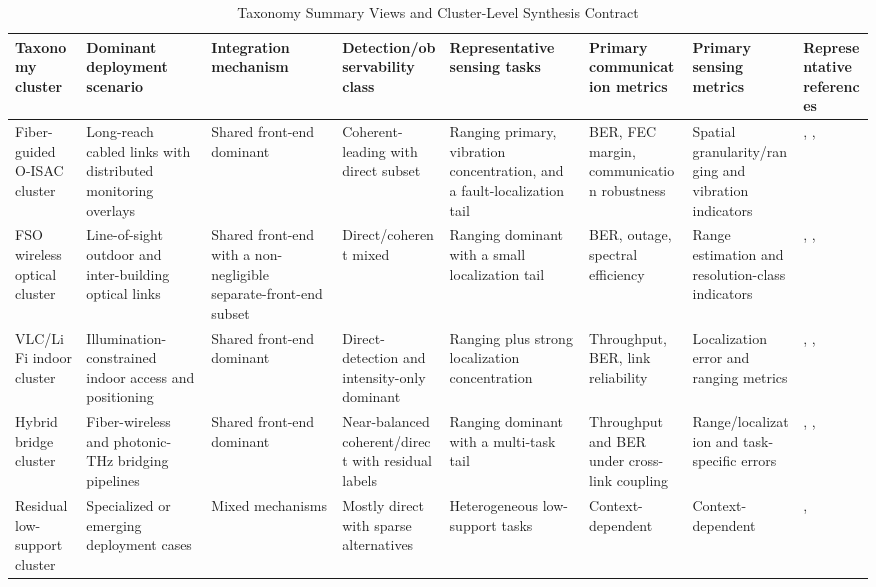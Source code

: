 \begin{table}[p]
\caption{Taxonomy Summary Views and Cluster-Level Synthesis Contract}
\label{tab:taxonomy_clusters}
\centering
\setlength{\tabcolsep}{3pt}
\renewcommand{\arraystretch}{1.08}
\begin{tabularx}{\textwidth}{L{1.75cm} Y Y Y Y L{1.65cm} L{1.7cm} L{2.1cm}}
\toprule
Taxonomy cluster & Dominant deployment scenario & Integration mechanism & Detection/observability class & Representative sensing tasks & Primary communication metrics & Primary sensing metrics & Representative references \\
\midrule
Fiber-guided O-ISAC cluster & Long-reach cabled links with distributed monitoring overlays & Shared front-end dominant & Coherent-leading with direct subset & Ranging primary, vibration concentration, and a fault-localization tail & BER, FEC margin, communication robustness & Spatial granularity/ranging and vibration indicators & \cite{O_ISAC_006}, \cite{O_ISAC_041}, \cite{O_ISAC_013} \\
FSO wireless optical cluster & Line-of-sight outdoor and inter-building optical links & Shared front-end with a non-negligible separate-front-end subset & Direct/coherent mixed & Ranging dominant with a small localization tail & BER, outage, spectral efficiency & Range estimation and resolution-class indicators & \cite{O_ISAC_021}, \cite{O_ISAC_023}, \cite{O_ISAC_199} \\
VLC/LiFi indoor cluster & Illumination-constrained indoor access and positioning & Shared front-end dominant & Direct-detection and intensity-only dominant & Ranging plus strong localization concentration & Throughput, BER, link reliability & Localization error and ranging metrics & \cite{O_ISAC_068}, \cite{O_ISAC_039}, \cite{O_ISAC_009} \\
Hybrid bridge cluster & Fiber-wireless and photonic-THz bridging pipelines & Shared front-end dominant & Near-balanced coherent/direct with residual labels & Ranging dominant with a multi-task tail & Throughput and BER under cross-link coupling & Range/localization and task-specific errors & \cite{O_ISAC_077}, \cite{O_ISAC_010}, \cite{O_ISAC_190} \\
Residual low-support cluster & Specialized or emerging deployment cases & Mixed mechanisms & Mostly direct with sparse alternatives & Heterogeneous low-support tasks & Context-dependent & Context-dependent & \cite{O_ISAC_070}, \cite{O_ISAC_056} \\
\bottomrule
\end{tabularx}
\end{table}

